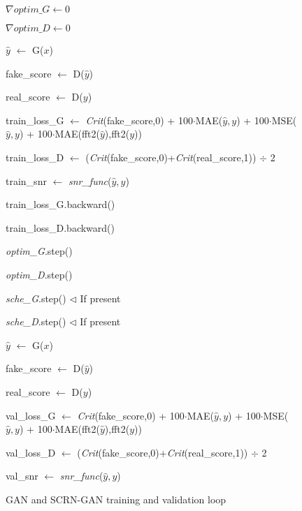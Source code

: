 \begin{figure}[ht]
	\centering
	\begin{minipage}{.95\linewidth}
		\begin{algorithm}[H]
			\caption{GAN and SCRN-GAN training and validation loop} \label{alg:GAN}
			
			{
				{	
					{$\nabla\textit{optim\_G} \leftarrow 0$} 
					
					{$\nabla\textit{optim\_D} \leftarrow 0$}
					
					{$\hat{y}$ $\leftarrow$ {G($x$)}}
					
					{fake\_score $\leftarrow$ D($\hat{y}$)}
					
					{real\_score $\leftarrow$ D($y$)}
					
					{train\_loss\_G $\leftarrow$ \textit{Crit}(fake\_score,0) + 100$\cdot$MAE($\hat{y},y$) + 100$\cdot$MSE($\hat{y},y$) + 100$\cdot$MAE(fft2($\hat{y}$),fft2($y$))}
					
					{train\_loss\_D $\leftarrow$ (\textit{Crit}(fake\_score,0)+\textit{Crit}(real\_score,1)) $\div$ 2}
					
					{train\_snr $\leftarrow$ \textit{snr\_func}($\hat{y},y$)}
					
					{train\_loss\_G.backward()}
					
					{train\_loss\_D.backward()}
					
					{\textit{optim\_G}.step()}
					
					{\textit{optim\_D}.step()}
					
				}
				{\textit{sche\_G}.step()    $\triangleleft$ If present}
				
				{\textit{sche\_D}.step()    $\triangleleft$ If present}
				
				{	
					{$\hat{y}$ $\leftarrow$ {G($x$)}}
					
					{fake\_score $\leftarrow$ D($\hat{y}$)}
					
					{real\_score $\leftarrow$ D($y$)}
					
					{val\_loss\_G $\leftarrow$ \textit{Crit}(fake\_score,0) + 100$\cdot$MAE($\hat{y},y$) + 100$\cdot$MSE($\hat{y},y$) + 100$\cdot$MAE(fft2($\hat{y}$),fft2($y$))}
					
					{val\_loss\_D $\leftarrow$ (\textit{Crit}(fake\_score,0)+\textit{Crit}(real\_score,1)) $\div$ 2}
					
					{val\_snr $\leftarrow$ \textit{snr\_func}($\hat{y},y$)}
					
				}
			}
		\end{algorithm}
	\end{minipage}
\end{figure}

